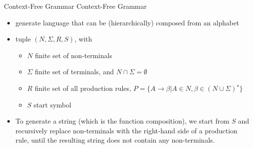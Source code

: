 \documentclass[main]{subfiles}
\begin{document}
\begin{frame}{Context-Free Grammar}
Context-Free Grammar~
\begin{itemize}
    \item generate language that can be (hierarchically) composed from an alphabet
    \item tuple $(N, \Sigma, R, S)$,
    with \begin{itemize}
        \item $N$ finite set of non-terminals
        \item $\Sigma$ finite set of terminals, and $N \cap\Sigma = \emptyset$ 
        \item $R$ finite set of all production rules, $P=\{A \rightarrow \beta \vert A \in N, \beta \in (N \cup \Sigma)^\star\}$
        \item $S$ start symbol
    \end{itemize}
    \item To generate a string (which is the function composition), we start from $S$ and recursively replace non-terminals with the right-hand side of a production rule, until the resulting string does not contain any non-terminals.
\end{itemize}
    
\end{frame}
\end{document}

